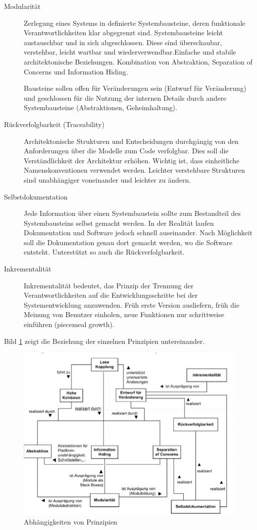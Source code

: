 \begin{description}
	\item[Modularität] Zerlegung eines Systems in definierte Systembausteine, deren funktionale Verantwortlichkeiten klar abgegrenzt sind. Systembausteine leicht austauschbar und in sich abgeschlossen. Diese sind überschaubar, verstehbar, leicht wartbar und wiederverwendbar.Einfache und stabile architektonische Beziehungen. Kombination von Abstraktion, Separation of Concerns und Information Hiding.
	
	Bausteine sollen offen für Veränderungen sein (Entwurf für Veränderung) und geschlossen für die Nutzung der internen Details durch andere Systembausteine (Abstraktionen, Geheimhaltung).
	
	\item[Rückverfolgbarkeit (Traceability)] Architektonische Strukturen und Entscheidungen durchgängig von den Anforderungen über die Modelle zum Code verfolgbar. Dies soll die Verständlichkeit der Architektur erhöhen. Wichtig ist, dass einheitliche Namenskonventionen verwendet werden. Leichter verstehbare Strukturen sind unabhängiger voneinander und leichter zu ändern.
	
	\item[Selbstdokumentation] Jede Information über einen Systembaustein sollte zum Bestandteil des Systembausteins selbst gemacht werden. In der Realität laufen Dokumentation und Software jedoch schnell auseinander. Nach Möglichkeit soll die Dokumentation genau dort gemacht werden, wo die Software entsteht. Unterstützt so auch die Rückverfolgbarkeit.
	
	\item[Inkrementalität] Inkrementalität bedeutet, das Prinzip der Trennung der Verantwortlichkeiten auf die Entwicklungsschritte bei der Systementwicklung anzuwenden. Früh erste Version ausliefern, früh die Meinung von Benutzer einholen, neue Funktionen nur schrittweise einführen (piecemeal growth).
	
\end{description}

Bild \ref{fig:abhangigkeiten-prinzipien} zeigt die Beziehung der einzelnen Prinzipien untereinander.

\begin{figure}[h!]
	\centering
	\includegraphics[width=0.6\linewidth]{fig/abhaengigkeiten-prinzipien}
	\caption{Abhängigkeiten von Prinzipien}
	\label{fig:abhangigkeiten-prinzipien}
\end{figure}

